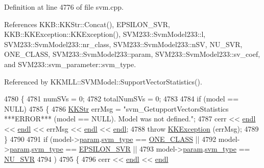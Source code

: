 Definition at line 4776 of file svm.\+cpp.



References K\+K\+B\+::\+K\+K\+Str\+::\+Concat(), E\+P\+S\+I\+L\+O\+N\+\_\+\+S\+VR, K\+K\+B\+::\+K\+K\+Exception\+::\+K\+K\+Exception(), S\+V\+M233\+::\+Svm\+Model233\+::l, S\+V\+M233\+::\+Svm\+Model233\+::nr\+\_\+class, S\+V\+M233\+::\+Svm\+Model233\+::n\+SV, N\+U\+\_\+\+S\+VR, O\+N\+E\+\_\+\+C\+L\+A\+SS, S\+V\+M233\+::\+Svm\+Model233\+::param, S\+V\+M233\+::\+Svm\+Model233\+::sv\+\_\+coef, and S\+V\+M233\+::svm\+\_\+parameter\+::svm\+\_\+type.



Referenced by K\+K\+M\+L\+L\+::\+S\+V\+M\+Model\+::\+Support\+Vector\+Statistics().


\begin{DoxyCode}
4780 \{
4781   numSVs      = 0;
4782   totalNumSVs = 0;
4783 
4784   \textcolor{keywordflow}{if}  (model == NULL)
4785   \{
4786     \hyperlink{class_k_k_b_1_1_k_k_str}{KKStr} errMsg = \textcolor{stringliteral}{"svm\_GetupportVectorsStatistics  ***ERROR***   (model == NULL).   Model was not
       defined."};
4787     cerr << \hyperlink{namespace_k_k_b_ad1f50f65af6adc8fa9e6f62d007818a8}{endl} << \hyperlink{namespace_k_k_b_ad1f50f65af6adc8fa9e6f62d007818a8}{endl} << errMsg << \hyperlink{namespace_k_k_b_ad1f50f65af6adc8fa9e6f62d007818a8}{endl} << \hyperlink{namespace_k_k_b_ad1f50f65af6adc8fa9e6f62d007818a8}{endl};
4788     \textcolor{keywordflow}{throw} \hyperlink{class_k_k_b_1_1_k_k_exception}{KKException} (errMsg);
4789   \}
4790 
4791   \textcolor{keywordflow}{if}  (model->\hyperlink{struct_s_v_m233_1_1_svm_model233_aea9d5d416f02777981c7677da2044571}{param}.\hyperlink{struct_s_v_m233_1_1svm__parameter_aa4cc55eaf546e2edb0ff62c5a5f8466e}{svm\_type} == \hyperlink{namespace_s_v_m233_acde4c278f323c82a6b41c27f6f30738aaea64d54fb16ebcd95d48c4aef97036df}{ONE\_CLASS}   ||
4792        model->\hyperlink{struct_s_v_m233_1_1_svm_model233_aea9d5d416f02777981c7677da2044571}{param}.\hyperlink{struct_s_v_m233_1_1svm__parameter_aa4cc55eaf546e2edb0ff62c5a5f8466e}{svm\_type} == \hyperlink{namespace_s_v_m233_acde4c278f323c82a6b41c27f6f30738aae7f29e93ef95067dcc6827e4fe3071c7}{EPSILON\_SVR} ||
4793        model->\hyperlink{struct_s_v_m233_1_1_svm_model233_aea9d5d416f02777981c7677da2044571}{param}.\hyperlink{struct_s_v_m233_1_1svm__parameter_aa4cc55eaf546e2edb0ff62c5a5f8466e}{svm\_type} == \hyperlink{namespace_s_v_m233_acde4c278f323c82a6b41c27f6f30738aaa9c624ae638f160fb1f00081960014b6}{NU\_SVR}
4794       )
4795   \{
4796     cerr << \hyperlink{namespace_k_k_b_ad1f50f65af6adc8fa9e6f62d007818a8}{endl} << \hyperlink{namespace_k_k_b_ad1f50f65af6adc8fa9e6f62d007818a8}{endl}

\end{DoxyCode}
